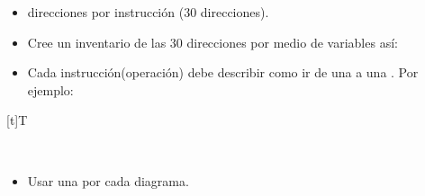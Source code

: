 \documentclass[letterpaper,10pt,spanish]{sphinxmanual}
\let\sphinxpxdimen\pdfpxdimen\else\newdimen\sphinxpxdimen
\begin{document}
\begin{enumerate}
\begin{itemize}
\item {} 
 direcciones por instrucción (30 direcciones).

\item {} 
\sphinxAtStartPar
Cree un inventario de las 30 direcciones por medio de variables así:

\begin{sphinxVerbatim}[commandchars=\\\{\}]



\end{sphinxVerbatim}

\item {} 
\sphinxAtStartPar
Cada instrucción(operación) debe describir como ir de una  a una . Por ejemplo:

\end{itemize}


\begin{savenotes}\sphinxattablestart
\sphinxthistablewithglobalstyle
\centering
\begin{tabulary}{\linewidth}[t]{T}
\sphinxtoprule
\sphinxtableatstartofbodyhook

\begin{sphinxfigure-in-table}
\centering
\capstart
\noindent\sphinxincludegraphics[width=700\sphinxpxdimen]{{image124}.png}
\label{\detokenize{1_guias/10programacion/G1023:id15}}\end{sphinxfigure-in-table}\relax
\\
\sphinxbottomrule
\end{tabulary}
\sphinxtableafterendhook\par
\sphinxattableend\end{savenotes}
\begin{itemize}
\item {} 
\sphinxAtStartPar
Usar una  por cada diagrama.


\end{itemize}
\end{enumerate}
\end{document}
